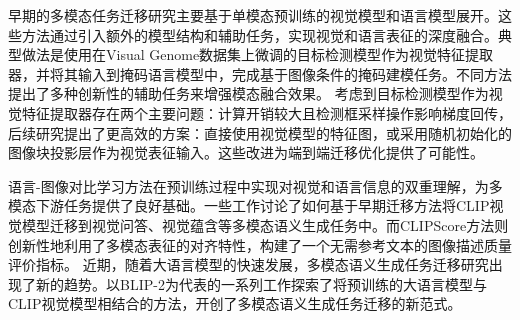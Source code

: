 早期的多模态任务迁移研究\cite{visualbert, vl-bert, uniter, OSCAR, VinVL, LEMON}主要基于单模态预训练的视觉模型和语言模型展开。这些方法通过引入额外的模型结构和辅助任务，实现视觉和语言表征的深度融合。典型做法是使用在Visual Genome数据集上微调的目标检测模型\cite{butd}作为视觉特征提取器，并将其输入到掩码语言模型\cite{BERT}中，完成基于图像条件的掩码建模任务。不同方法提出了多种创新性的辅助任务来增强模态融合效果。
考虑到目标检测模型作为视觉特征提取器存在两个主要问题：计算开销较大且检测框采样操作影响梯度回传，后续研究\cite{pixelbert, soho, vilt}提出了更高效的方案：直接使用视觉模型的特征图，或采用随机初始化的图像块投影层作为视觉表征输入。这些改进为端到端迁移优化提供了可能性。

语言-图像对比学习方法在预训练过程中实现对视觉和语言信息的双重理解，为多模态下游任务提供了良好基础。一些工作\cite{song-etal-2022-clip, shen2022how}讨论了如何基于早期迁移方法将CLIP视觉模型迁移到视觉问答、视觉蕴含等多模态语义生成任务中。而CLIPScore方法\cite{CLIPScore}则创新性地利用了多模态表征的对齐特性，构建了一个无需参考文本的图像描述质量评价指标。
近期，随着大语言模型的快速发展，多模态语义生成任务迁移研究出现了新的趋势。以BLIP-2\cite{blip-2}为代表的一系列工作\cite{minigpt4,llava,llavanextinterleave}探索了将预训练的大语言模型与CLIP视觉模型相结合的方法，开创了多模态语义生成任务迁移的新范式。


